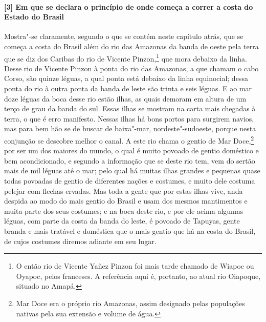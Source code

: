 \paragraph{[3] Em que se declara o princípio de onde começa a correr a costa do Estado do
Brasil} \quad
Mostra"-se claramente, segundo o que se contém neste capítulo atrás, que se começa a costa
do Brasil além do rio das Amazonas da banda de oeste pela terra que se diz dos Caribas do
rio de Vicente Pinzon,\footnote{ O então rio de Vicente Yañez Pinzon foi mais tarde
chamado de Wiapoc ou Oyapoc, pelos franceses. A referência aqui é, portanto, ao atual rio
Oiapoque, situado no Amapá.} que mora debaixo da linha. Desse rio de Vicente Pinzon à
ponta do rio das Amazonas, a que chamam o cabo Corso, são quinze léguas, a qual ponta está
debaixo da linha equinocial; dessa ponta do rio à outra ponta da banda de leste são trinta
e seis léguas. E ao mar doze léguas da boca desse rio estão ilhas, as quais demoram em
altura de um terço de grau da banda do sul. Essas ilhas se mostram na carta mais chegadas
à terra, o que é erro manifesto. Nessas ilhas há bons portos para surgirem navios, mas
para bem hão se de buscar de baixa"-mar, nordeste"-sudoeste, porque nesta conjunção se
descobre melhor o canal. A este rio chama o gentio de Mar Doce,\footnote{ Mar Doce era o
próprio rio Amazonas, assim designado pelas populações nativas pela sua extensão e volume
de água.} por ser um dos maiores do mundo, o qual é muito povoado de gentio doméstico e
bem acondicionado, e segundo a informação que se deste rio tem, vem do sertão mais de mil
léguas até o mar; pelo qual há muitas ilhas grandes e pequenas quase todas povoadas de
gentio de diferentes nações e costumes, e muito dele costuma pelejar com flechas ervadas.
Mas toda a gente que por estas ilhas vive, anda despida ao modo do mais gentio do Brasil e
usam dos mesmos mantimentos e muita parte dos seus costumes; e na boca deste rio, e por
ele acima algumas léguas, com parte da costa da banda do leste, é povoado de Tapuyas,
gente branda e mais tratável e doméstica que o mais gentio que há na costa do Brasil, de
cujos costumes diremos adiante em seu lugar.

